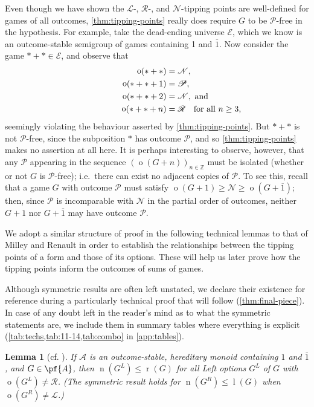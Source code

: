 \documentclass[11pt]{article}
\newtheorem{lemma}[theorem]{Lemma}
\theoremstyle{definition}
\DeclareMathOperator{\outcome}{o}
\newcommand{\set}[1]{\mathcal{#1}}
\DeclareMathOperator{\ltp}{l}
\DeclareMathOperator{\ntp}{n}
\DeclareMathOperator{\rtp}{r}
\begin{document}
Even though we have shown the $\mathscr{L}$-, $\mathscr{R}$-, and
$\mathscr{N}$-tipping points are well-defined for games of all outcomes,
\cref{thm:tipping-points} really does require $G$ to be $\mathscr{P}$-free in
the hypothesis. For example, take the dead-ending universe $\set{E}$, which we
know is an outcome-stable semigroup of games containing 1 and $\overline{1}$.
Now consider the game $*+*\in\set{E}$, and observe that
\begin{align*}
    \outcome(*+*)&=\mathscr{N},\\
    \outcome(*+*+1)&=\mathscr{P},\\
    \outcome(*+*+2)&=\mathscr{N},\rlap{ and}\\
    \outcome(*+*+n)&=\mathscr{R}\rlap{\quad for all $n\geq3$,}
\end{align*}
seemingly violating the behaviour asserted by \cref{thm:tipping-points}. But
$*+*$ is not $\mathscr{P}$-free, since the subposition $*$ has outcome
$\mathscr{P}$, and so \cref{thm:tipping-points} makes no assertion at all here.
It is perhaps interesting to observe, however, that any $\mathscr{P}$ appearing
in the sequence $(\outcome(G+n))_{n\in\mathbb{Z}}$ must be isolated (whether or
not $G$ is $\mathscr{P}$-free); i.e.\ there can exist no adjacent copies of
$\mathscr{P}$. To see this, recall that a game $G$ with outcome $\mathscr{P}$
must satisfy $\outcome(G+1)\geq\mathscr{N}\geq\outcome(G+\overline{1})$; then,
since $\mathscr{P}$ is incomparable with $\mathscr{N}$ in the partial order of
outcomes, neither $G+1$ nor $G+\overline{1}$ may have outcome $\mathscr{P}$.

We adopt a similar structure of proof in the following technical lemmas to that
of Milley and Renault \cite{milley.renault:invertible} in order to establish
the relationships between the tipping points of a form and those of its
options. These will help us later prove how the tipping points inform the
outcomes of sums of games. 

Although symmetric results are often left unstated, we declare their existence
for reference during a particularly technical proof that will follow
(\cref{thm:final-piece}). In case of any doubt left in the reader's mind as to
what the symmetric statements are, we include them in summary tables where
everything is explicit (\cref{tab:techs,tab:11-14,tab:combo} in
\cref{app:tables}).

\begin{lemma}[cf. {\cite[Lemmas 7--9 on pp.~6--7]{milley.renault:invertible}}]
    \label{lem:tech1}
    If $\set{A}$ is an outcome-stable, hereditary monoid containing $1$ and
    $\overline{1}$, and $G\in\pf{A}$, then $\ntp(G^L)\leq\rtp(G)$ for all Left
    options $G^L$ of $G$ with $\outcome(G^L)\neq\mathscr{R}$. (The symmetric
    result holds for $\ntp(G^R)\leq\ltp(G)$ when
    $\outcome(G^R)\neq\mathscr{L}$.)
\end{lemma}
\end{document}
